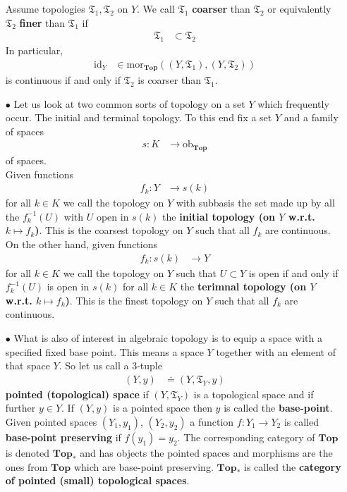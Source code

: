 \begin{exa}
\begin{enumerate}
Assume topologies $\mathfrak{T}_{1},\mathfrak{T}_{2}$ on $Y$. We call $\mathfrak{T}_{1}$ \textbf{coarser} than $\mathfrak{T}_{2}$ or equivalently $\mathfrak{T}_{2}$ \textbf{finer} than $\mathfrak{T}_{1}$ if 
\begin{align*}
  \mathfrak{T}_{1}
  &\subset
  \mathfrak{T}_{2}
\end{align*}
In particular,
\begin{align*}
  \mathrm{id}_{Y}
  &\in
  \mathrm{mor}_{\mathbf{Top}}
  \left(
    (Y,\mathfrak{T}_{1}),
    (Y,\mathfrak{T}_{2})
  \right)
\end{align*}
is continuous if and only if $\mathfrak{T}_{2}$ is coarser than $\mathfrak{T}_{1}$.
\item[$\bullet$]
Let us look at two common sorts of topology on a set $Y$ which frequently occur. The initial and terminal topology. To this end fix a set $Y$ and a family of spaces
\begin{align*}
  s
  \colon
  K
  &\rightarrow
  \mathrm{ob}_{\mathbf{Top}}
\end{align*}
of spaces.
\\
Given functions
\begin{align*}
  f_{k}
  \colon
  Y
  &\rightarrow
  s(k)
\end{align*}
for all $k \in K$ we call the topology on $Y$ with subbasis the set made up by all the $f_{k}^{-1}(U)$ with $U$ open in $s(k)$ the \textbf{initial topology (on $Y$ w.r.t. $k \mapsto f_{k}$)}. This is the coarsest topology on $Y$ such that all $f_{k}$ are continuous.
\\
On the other hand, given functions
\begin{align*}
  f_{k}
  \colon
  s(k)
  &\rightarrow
  Y
\end{align*}
for all $k \in K$ we call the topology on $Y$ such that $U \subset Y$ is open if and only if $f_{k}^{-1}(U)$ is open in $s(k)$ for all $k \in K$ the \textbf{terimnal topology (on $Y$ w.r.t. $k \mapsto f_{k}$)}. This is the finest topology on $Y$ such that all $f_{k}$ are continuous.
\item[$\bullet$]
What is also of interest in algebraic topology is to equip a space with a specified fixed base point. This means a space $Y$ together with an element of that space $Y$. So let us call a $3$-tuple
\begin{align*}
  (Y,y)
  &\doteq
  (Y,\mathfrak{T}_{Y},y)
\end{align*}
\textbf{pointed (topological) space} if $(Y,\mathfrak{T}_{Y})$ is a topological space and if further $y \in Y$. If $(Y,y)$ is a pointed space then $y$ is called the \textbf{base-point}. Given pointed spaces $(Y_{1},y_{1})$, $(Y_{2},y_{2})$ a function $f \colon Y_{1} \rightarrow Y_{2}$ is called \textbf{base-point preserving} if $f(y_{1}) = y_{2}$. The corresponding category of $\mathbf{Top}$ is denoted $\mathbf{Top}_{\ast}$ and has objects the pointed spaces and morphisms are the ones from $\mathbf{Top}$ which are base-point preserving. $\mathbf{Top}_{\ast}$ is called the \textbf{category of pointed (small) topological spaces}.

\end{enumerate}
\end{exa}
